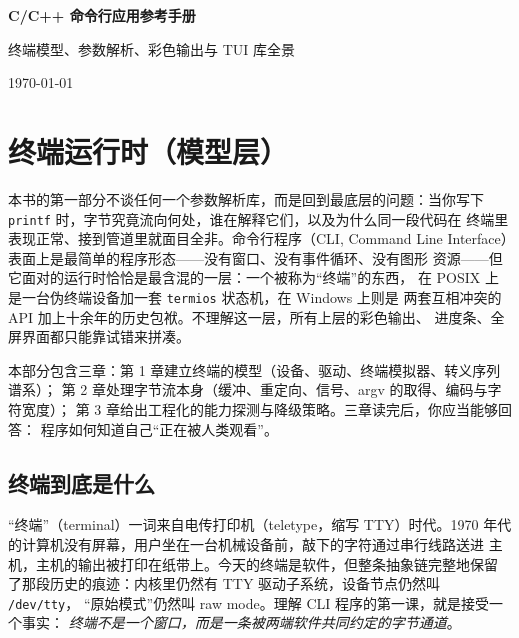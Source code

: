 \documentclass[12pt,a4paper,fontset=fandol]{ctexbook}
\newcommand{\Tp}[1]{\texttt{#1}}
\begin{document}
\frontmatter

\begin{titlepage}
\centering
\vspace*{4cm}
{\Huge\bfseries C/C++ 命令行应用参考手册\par}
\vspace{1cm}
{\LARGE 终端模型、参数解析、彩色输出与 TUI 库全景\par}
\vfill
{\large \today\par}
\end{titlepage}

\tableofcontents

\mainmatter

\cleardoublepage

\part{终端运行时（模型层）}

本书的第一部分不谈任何一个参数解析库，而是回到最底层的问题：当你写下
\Tp{printf} 时，字节究竟流向何处，谁在解释它们，以及为什么同一段代码在
终端里表现正常、接到管道里就面目全非。命令行程序（CLI, Command Line
Interface）表面上是最简单的程序形态——没有窗口、没有事件循环、没有图形
资源——但它面对的运行时恰恰是最含混的一层：一个被称为``终端''的东西，
在 POSIX 上是一台伪终端设备加一套 \Tp{termios} 状态机，在 Windows 上则是
两套互相冲突的 API 加上十余年的历史包袱。不理解这一层，所有上层的彩色输出、
进度条、全屏界面都只能靠试错来拼凑。

本部分包含三章：第 1 章建立终端的模型（设备、驱动、终端模拟器、转义序列谱系）；
第 2 章处理字节流本身（缓冲、重定向、信号、argv 的取得、编码与字符宽度）；
第 3 章给出工程化的能力探测与降级策略。三章读完后，你应当能够回答：
程序如何知道自己``正在被人类观看''。

\chapter{终端到底是什么}

``终端''（terminal）一词来自电传打印机（teletype，缩写 TTY）时代。1970
年代的计算机没有屏幕，用户坐在一台机械设备前，敲下的字符通过串行线路送进
主机，主机的输出被打印在纸带上。今天的终端是软件，但整条抽象链完整地保留
了那段历史的痕迹：内核里仍然有 TTY 驱动子系统，设备节点仍然叫 \Tp{/dev/tty}，
``原始模式''仍然叫 raw mode。理解 CLI 程序的第一课，就是接受一个事实：
\emph{终端不是一个窗口，而是一条被两端软件共同约定的字节通道}。
\end{document}
